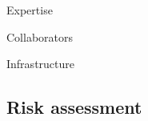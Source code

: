 \documentclass[a4paper,10pt,fleqn]{application}
\begin{document}
Expertise


Collaborators

Infrastructure


\subsection{Risk assessment}
\end{document}
